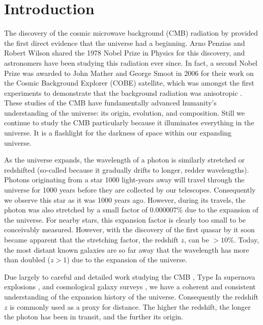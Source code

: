 \chapter{Introduction}

\begin{bibunit}

The discovery of the cosmic microwave background (CMB) radiation by \citet{1965ApJ...142..419P}
provided the first direct evidence that the universe had a beginning. Arno Penzias and Robert Wilson
shared the 1978 Nobel Prize in Physics for this discovery, and astronomers have been studying this
radiation ever since. In fact, a second Nobel Prize was awarded to John Mather and George Smoot in
2006 for their work on the Cosmic Background Explorer (COBE) satellite, which was amongst the first
experiments to demonstrate that the background radiation was anisotropic
\citep{1992ApJ...396L...1S}. These studies of the CMB have fundamentally advanced humanity's
understanding of the universe: its origin, evolution, and composition. Still we continue to study
the CMB particularly because it illuminates everything in the universe. It is a flashlight for the
darkness of space within our expanding universe.

As the universe expands, the wavelength of a photon is similarly stretched or redshifted (so-called
because it gradually drifts to longer, redder wavelengths). Photons originating from a star 1000
light-years away will travel through the universe for 1000 years before they are collected by our
telescopes. Consequently we observe this star as it was 1000 years ago. However, during its travels,
the photon was also stretched by a small factor of $0.000007\%$ due to the expansion of the
universe.  For nearby stars, this expansion factor is clearly too small to be conceivably measured.
However, with the discovery of the first quasar by \citet{1963Natur.197.1040S} it soon became
apparent that the stretching factor, the redshift $z$, can be $>10\%$. Today, the most distant known
galaxies are so far away that the wavelength has more than doubled ($z > 1$) due to the expansion of
the universe. 

Due largely to careful and detailed work studying the CMB \citep[e.g.,][]{2016A&A...594A..25P}, Type
Ia supernova explosions \citep[e.g.,][]{1998AJ....116.1009R,1999ApJ...517..565P}, and cosmological
galaxy surveys \citep[e.g.,][]{2001MNRAS.328.1039C}, we have a coherent and consistent understanding
of the expansion history of the universe. Consequently the redshift $z$ is commonly used as a proxy
for distance. The higher the redshift, the longer the photon has been in transit, and the further
its origin.


\end{bibunit}
